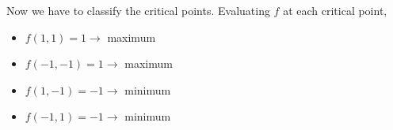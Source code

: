 {    Now we have to classify the critical points. Evaluating $f$ at each critical point,
    \begin{itemize}
        \item $f(1,1) = 1\rightarrow$ maximum
        \item $f(-1,-1) = 1\rightarrow$ maximum
        \item $f(1,-1) = -1\rightarrow$ minimum
        \item $f(-1,1) = -1\rightarrow$ minimum
    \end{itemize}
}


